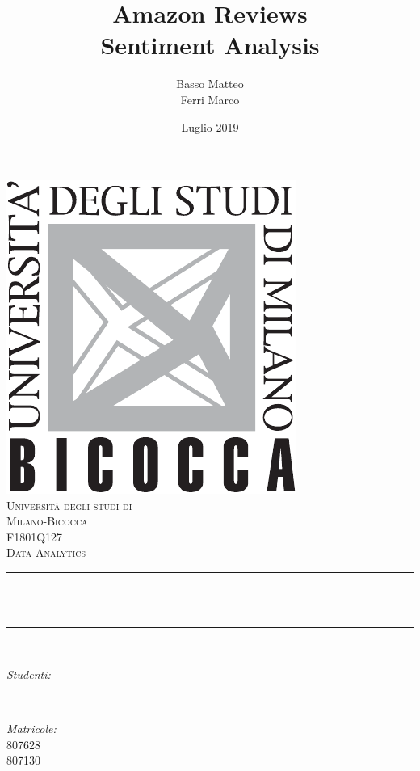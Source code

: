 \documentclass[hidelinks, 12pt]{article}
\title{Amazon Reviews \\ Sentiment Analysis}				%
\author{Basso Matteo \\ Ferri Marco}								%
\date{Luglio 2019}				%
\makeatletter
\let\thetitle\@title
\let\theauthor\@author
\let\thedate\@date
\makeatother
\begin{document}
	

\begin{titlepage}
	\centering
	\vspace*{0.5 cm}
	\includegraphics[scale = 0.75]{images/LogoBicocca.pdf}\\[1.0 cm]	%
	\textsc{\LARGE Università degli studi di}\\[0.2 cm]
	\textsc{\LARGE Milano-Bicocca}\\[2.0 cm]	%
	\textsc{\Large F1801Q127}\\[0.5 cm]				%
	\textsc{\large Data Analytics}				%
	\rule{\linewidth}{0.2 mm} \\[0.4 cm]
	{ \huge \bfseries \thetitle}\\
	\rule{\linewidth}{0.2 mm} \\[1.5 cm]
	
	\begin{minipage}{0.4\textwidth}
		\begin{flushleft} \large
			\emph{Studenti:}\\
			\theauthor
		\end{flushleft}
	\end{minipage}~
	\begin{minipage}{0.4\textwidth}
		\begin{flushright} \large
			\emph{Matricole:} \\
			807628 \\ 807130
		\end{flushright}
	\end{minipage}\\[2 cm]
	
	{\large \thedate}\\[2 cm]
	
	\vfill
	
\end{titlepage}
\end{document}

